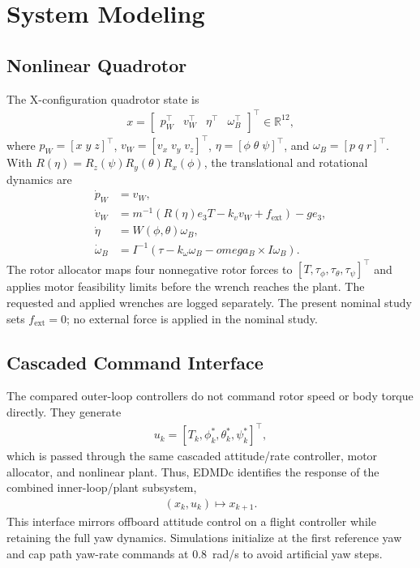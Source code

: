 \documentclass[letterpaper,10pt,conference]{ieeeconf}
\begin{document}
\section{System Modeling}
\label{sec:system_modeling}

\subsection{Nonlinear Quadrotor}

The X-configuration quadrotor state is
\begin{align}
x=\begin{bmatrix}p_W^\top&v_W^\top&\eta^\top&\omega_B^\top\end{bmatrix}^\top
\in\mathbb{R}^{12},
\end{align}
where $p_W=[x\;y\;z]^\top$, $v_W=[v_x\;v_y\;v_z]^\top$,
$\eta=[\phi\;\theta\;\psi]^\top$, and
$\omega_B=[p\;q\;r]^\top$. With
$R(\eta)=R_z(\psi)R_y(\theta)R_x(\phi)$, the translational and rotational
dynamics are
\begin{subequations}
\begin{align}
\dot p_W &= v_W,\\
\dot v_W &= m^{-1}\!\left(R(\eta)e_3T-k_vv_W+f_{\mathrm{ext}}\right)-ge_3,\\
\dot\eta &= W(\phi,\theta)\omega_B,\\
\dot\omega_B &= I^{-1}\!\left(\tau-k_\omega\omega_B-omega_B\times I\omega_B\right).
\end{align}
\end{subequations}
The rotor allocator maps four nonnegative rotor forces to
$[T,\tau_\phi,\tau_\theta,\tau_\psi]^\top$ and applies motor feasibility
limits before the wrench reaches the plant. The requested and applied wrenches
are logged separately. The present nominal study sets $f_{\mathrm{ext}}=0$;
no external force is applied in the nominal study.

\subsection{Cascaded Command Interface}
\label{sec:cascade}

The compared outer-loop controllers do not command rotor speed or body torque
directly. They generate
\begin{align}
u_k=[T_k,\phi_k^*,\theta_k^*,\psi_k^*]^\top,
\label{eq:outer_input}
\end{align}
which is passed through the same cascaded attitude/rate controller, motor
allocator, and nonlinear plant. Thus, EDMDc identifies the response of the
combined inner-loop/plant subsystem,
\begin{align}
(x_k,u_k)\longmapsto x_{k+1}.
\end{align}
This interface mirrors offboard attitude control on a flight controller while
retaining the full yaw dynamics. Simulations initialize at the first reference
yaw and cap path yaw-rate commands at 0.8~rad/s to avoid artificial yaw steps.
\end{document}
